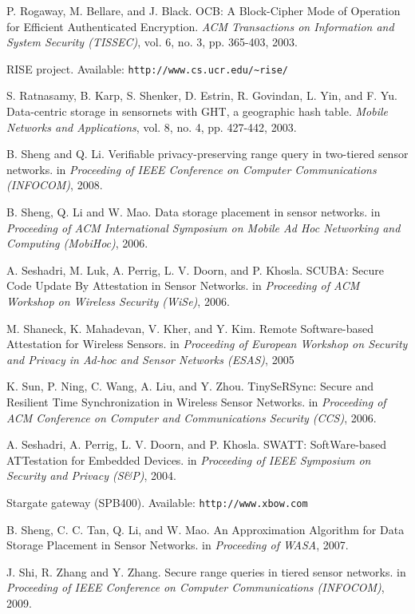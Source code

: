 \documentclass[conference]{IEEEtran}
\begin{document}
\begin{thebibliography}{1}
P. Rogaway, M. Bellare, and J. Black. OCB: A Block-Cipher Mode of Operation for Efficient Authenticated Encryption. \emph{ACM Transactions on Information and System Security (TISSEC)}, vol. 6, no. 3, pp. 365-403, 2003.

RISE project. Available: \verb"http://www.cs.ucr.edu/~rise/"

S. Ratnasamy, B. Karp, S. Shenker, D. Estrin, R. Govindan, L. Yin, and F. Yu. Data-centric storage in sensornets with GHT, a geographic hash table. \emph{Mobile Networks and Applications}, vol. 8, no. 4, pp. 427-442, 2003.

B. Sheng and Q. Li. Verifiable privacy-preserving range query in two-tiered sensor networks. in \emph{Proceeding of IEEE Conference on Computer Communications (INFOCOM)}, 2008.

B. Sheng, Q. Li and W. Mao. Data storage placement in sensor networks. in \emph{Proceeding of ACM International Symposium on Mobile Ad Hoc Networking and Computing (MobiHoc)}, 2006.

A. Seshadri, M. Luk, A. Perrig, L. V. Doorn, and P. Khosla. SCUBA: Secure Code Update By Attestation in Sensor Networks. in \emph{Proceeding of ACM Workshop on Wireless Security (WiSe)}, 2006.

M. Shaneck, K. Mahadevan, V. Kher, and Y. Kim. Remote Software-based Attestation for Wireless Sensors. in \emph{Proceeding of European Workshop on Security and Privacy in Ad-hoc and Sensor Networks (ESAS)}, 2005

K. Sun, P. Ning, C. Wang, A. Liu, and Y. Zhou. TinySeRSync: Secure and Resilient Time Synchronization in Wireless Sensor Networks. in \emph{Proceeding of ACM Conference on Computer and Communications Security (CCS)}, 2006.

A. Seshadri, A. Perrig, L. V. Doorn, and P. Khosla. SWATT: SoftWare-based ATTestation for Embedded Devices. in \emph{Proceeding of IEEE Symposium on Security and Privacy (S\&P)}, 2004.

Stargate gateway (SPB400). Available: \verb"http://www.xbow.com"

B. Sheng, C. C. Tan, Q. Li, and W. Mao. An Approximation Algorithm for Data Storage Placement in Sensor Networks. in \emph{Proceeding of WASA}, 2007.

J. Shi, R. Zhang  and Y. Zhang. Secure range queries in tiered sensor networks. in \emph{Proceeding of IEEE Conference on Computer Communications (INFOCOM)}, 2009.


\end{thebibliography}
\end{document}
